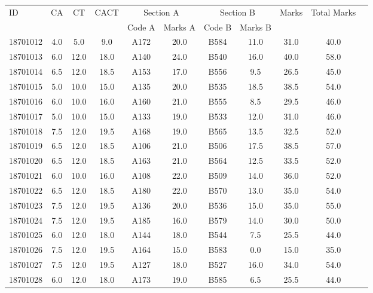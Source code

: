 \documentclass[12pt]{article}
\begin{document}
    \begin{center} 
	\renewcommand{\arraystretch}{1.08}
	\begin{small}
    \begin{tabular}{|l|c|c|c|c|c|c|c|c|c|c|} \hline
	\multirow{2}{*}{ID} & 	\multirow{2}{*}{CA}  & 	\multirow{2}{*}{CT}  & 	\multirow{2}{*}{CACT}  & \multicolumn{2 }{c|}{Section A}& \multicolumn{2 }{c|}{Section B} & 	\multirow{2}{*}{Marks}  & 	\multirow{2}{*}{Total Marks}  \\ 
	&  &  &  & Code A & Marks A & Code B & Marks B&  &  \\ \hline
18701012 & 4.0 & 5.0 & 9.0 & A172 & 20.0 & B584 & 11.0 & 31.0 & 40.0\\ \hline 
18701013 & 6.0 & 12.0 & 18.0 & A140 & 24.0 & B540 & 16.0 & 40.0 & 58.0\\ \hline 
18701014 & 6.5 & 12.0 & 18.5 & A153 & 17.0 & B556 & 9.5 & 26.5 & 45.0\\ \hline 
18701015 & 5.0 & 10.0 & 15.0 & A135 & 20.0 & B535 & 18.5 & 38.5 & 54.0\\ \hline 
18701016 & 6.0 & 10.0 & 16.0 & A160 & 21.0 & B555 & 8.5 & 29.5 & 46.0\\ \hline 
18701017 & 5.0 & 10.0 & 15.0 & A133 & 19.0 & B533 & 12.0 & 31.0 & 46.0\\ \hline 
18701018 & 7.5 & 12.0 & 19.5 & A168 & 19.0 & B565 & 13.5 & 32.5 & 52.0\\ \hline 
18701019 & 6.5 & 12.0 & 18.5 & A106 & 21.0 & B506 & 17.5 & 38.5 & 57.0\\ \hline 
18701020 & 6.5 & 12.0 & 18.5 & A163 & 21.0 & B564 & 12.5 & 33.5 & 52.0\\ \hline 
18701021 & 6.0 & 10.0 & 16.0 & A108 & 22.0 & B509 & 14.0 & 36.0 & 52.0\\ \hline 
18701022 & 6.5 & 12.0 & 18.5 & A180 & 22.0 & B570 & 13.0 & 35.0 & 54.0\\ \hline 
18701023 & 7.5 & 12.0 & 19.5 & A136 & 20.0 & B536 & 15.0 & 35.0 & 55.0\\ \hline 
18701024 & 7.5 & 12.0 & 19.5 & A185 & 16.0 & B579 & 14.0 & 30.0 & 50.0\\ \hline 
18701025 & 6.0 & 12.0 & 18.0 & A144 & 18.0 & B544 & 7.5 & 25.5 & 44.0\\ \hline 
18701026 & 7.5 & 12.0 & 19.5 & A164 & 15.0 & B583 & 0.0 & 15.0 & 35.0\\ \hline 
18701027 & 7.5 & 12.0 & 19.5 & A127 & 18.0 & B527 & 16.0 & 34.0 & 54.0\\ \hline 
18701028 & 6.0 & 12.0 & 18.0 & A173 & 19.0 & B585 & 6.5 & 25.5 & 44.0\\ \hline 

\end{tabular}
\end{small}
\end{center}
\end{document}
